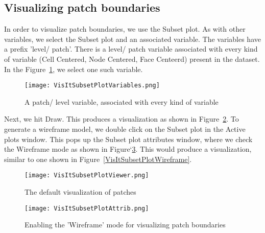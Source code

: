 \subsection{Visualizing patch boundaries}
In order to visualize patch boundaries, we use the Subset plot. As with other variables, we select the Subset plot and an associated variable. The variables have a prefix 'level/ patch'. There is a level/ patch variable associated with every kind of variable (Cell Centered, Node Centered, Face Centeerd) present in the dataset. In the Figure~\ref{VisItSubsetPlotVariables}, we select one such variable.


\begin{figure}
  \center
  \texttt{[image: VisItSubsetPlotVariables.png]}
  \caption{A patch/ level variable, associated with every kind of variable}
  \label{VisItSubsetPlotVariables}
\end{figure}

Next, we hit Draw. This produces a visualization as shown in Figure~\ref{VisItSubsetPlotViewer}. To generate a wireframe model, we double click on the Subset plot in the Active plots window. This pops up the Subset plot attributes window, where we check the Wireframe mode as shown in Figure`\ref{VisItSubsetPlotAttrib}. This would produce a visualization, similar to one shown in Figure~\ref{VisItSubsetPlotWireframe}.

\begin{figure}
  \center
  \texttt{[image: VisItSubsetPlotViewer.png]}
  \caption{The default visualization of patches} 
  \label{VisItSubsetPlotViewer}
\end{figure}

\begin{figure}
  \center
  \texttt{[image: VisItSubsetPlotAttrib.png]}
  \caption{Enabling the 'Wireframe' mode for visualizing patch boundaries}
  \label{VisItSubsetPlotAttrib}
\end{figure}

